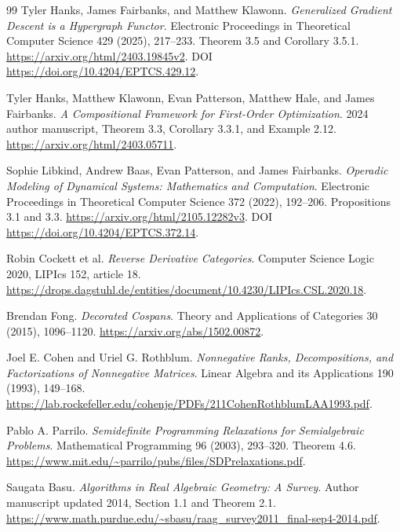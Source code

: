 \documentclass[11pt]{article}
\theoremstyle{remark}
\begin{document}
\begin{thebibliography}{99}
Tyler Hanks, James Fairbanks, and Matthew Klawonn.
\emph{Generalized Gradient Descent is a Hypergraph Functor}.
Electronic Proceedings in Theoretical Computer Science 429 (2025), 217--233.
Theorem 3.5 and Corollary 3.5.1.
\url{https://arxiv.org/html/2403.19845v2}.
DOI \url{https://doi.org/10.4204/EPTCS.429.12}.

Tyler Hanks, Matthew Klawonn, Evan Patterson, Matthew Hale, and James Fairbanks.
\emph{A Compositional Framework for First-Order Optimization}.
2024 author manuscript, Theorem 3.3, Corollary 3.3.1, and Example 2.12.
\url{https://arxiv.org/html/2403.05711}.

Sophie Libkind, Andrew Baas, Evan Patterson, and James Fairbanks.
\emph{Operadic Modeling of Dynamical Systems: Mathematics and Computation}.
Electronic Proceedings in Theoretical Computer Science 372 (2022), 192--206.
Propositions 3.1 and 3.3.
\url{https://arxiv.org/html/2105.12282v3}.
DOI \url{https://doi.org/10.4204/EPTCS.372.14}.

Robin Cockett et al.
\emph{Reverse Derivative Categories}.
Computer Science Logic 2020, LIPIcs 152, article 18.
\url{https://drops.dagstuhl.de/entities/document/10.4230/LIPIcs.CSL.2020.18}.

Brendan Fong.
\emph{Decorated Cospans}.
Theory and Applications of Categories 30 (2015), 1096--1120.
\url{https://arxiv.org/abs/1502.00872}.

Joel E. Cohen and Uriel G. Rothblum.
\emph{Nonnegative Ranks, Decompositions, and Factorizations of Nonnegative Matrices}.
Linear Algebra and its Applications 190 (1993), 149--168.
\url{https://lab.rockefeller.edu/cohenje/PDFs/211CohenRothblumLAA1993.pdf}.

Pablo A. Parrilo.
\emph{Semidefinite Programming Relaxations for Semialgebraic Problems}.
Mathematical Programming 96 (2003), 293--320. Theorem 4.6.
\url{https://www.mit.edu/~parrilo/pubs/files/SDPrelaxations.pdf}.

Saugata Basu.
\emph{Algorithms in Real Algebraic Geometry: A Survey}.
Author manuscript updated 2014, Section 1.1 and Theorem 2.1.
\url{https://www.math.purdue.edu/~sbasu/raag_survey2011_final-sep4-2014.pdf}.
\end{thebibliography}
\end{document}
